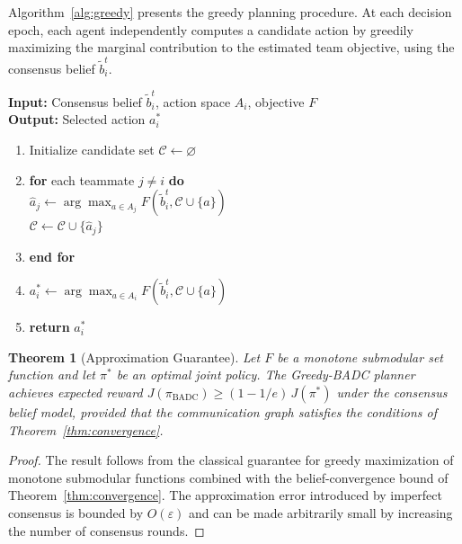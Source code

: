 \documentclass[12pt,oneside]{report}
\newtheorem{theorem}{Theorem}[chapter]
\theoremstyle{definition}
\theoremstyle{remark}
\begin{document}
Algorithm~\ref{alg:greedy} presents the greedy planning procedure. At each
decision epoch, each agent independently computes a candidate action by
greedily maximizing the marginal contribution to the estimated team objective,
using the consensus belief $\tilde{b}_i^t$.

\begin{tcolorbox}[
  colback=jhulight,
  colframe=jhublue,
  arc=4pt,
  boxrule=0.8pt,
  left=16pt,
  right=16pt,
  top=10pt,
  bottom=10pt,
  title={\color{jhublue}\textbf{Algorithm 1: Greedy-BADC Planner}},
  fonttitle=\bfseries
]
\vspace{2pt}
\textbf{Input:} Consensus belief $\tilde{b}_i^t$, action space $A_i$,
  objective $F$\\
\textbf{Output:} Selected action $a_i^*$
\vspace{4pt}
\begin{enumerate}[leftmargin=*,itemsep=2pt,topsep=2pt]
  \item Initialize candidate set $\mathcal{C} \leftarrow \varnothing$
  \item \textbf{for} each teammate $j \neq i$ \textbf{do}\\[-2pt]
        \hspace*{12pt} $\hat{a}_j \leftarrow \arg\max_{a \in A_j} F(\tilde{b}_i^t, \mathcal{C} \cup \{a\})$\\[-2pt]
        \hspace*{12pt} $\mathcal{C} \leftarrow \mathcal{C} \cup \{\hat{a}_j\}$
  \item \textbf{end for}
  \item $a_i^* \leftarrow \arg\max_{a \in A_i} F(\tilde{b}_i^t, \mathcal{C} \cup \{a\})$
  \item \textbf{return} $a_i^*$
\end{enumerate}
\vspace{2pt}
\end{tcolorbox}
\vspace{8pt}

\begin{theorem}[Approximation Guarantee]
  \label{thm:approx}
  Let $F$ be a monotone submodular set function and let $\pi^*$ be an optimal
  joint policy. The Greedy-BADC planner achieves expected reward
  $J(\pi_{\text{BADC}}) \geq (1 - 1/e) \, J(\pi^*)$ under the consensus belief
  model, provided that the communication graph satisfies the conditions of
  Theorem~\ref{thm:convergence}.
\end{theorem}

\begin{proof}
  The result follows from the classical guarantee for greedy maximization of
  monotone submodular functions \citep{nemhauser1978analysis} combined with
  the belief-convergence bound of Theorem~\ref{thm:convergence}. The
  approximation error introduced by imperfect consensus is bounded by
  $O(\varepsilon)$ and can be made arbitrarily small by increasing the
  number of consensus rounds.
\end{proof}
\end{document}
